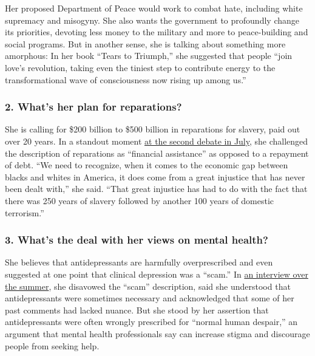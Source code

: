 Her proposed Department of Peace would work to combat hate, including
white supremacy and misogyny. She also wants the government to
profoundly change its priorities, devoting less money to the military
and more to peace-building and social programs. But in another sense,
she is talking about something more amorphous: In her book ``Tears to
Triumph,'' she suggested that people ``join love's revolution, taking
even the tiniest step to contribute energy to the transformational wave
of consciousness now rising up among us.''

\hypertarget{2-whats-her-plan-for-reparations}{%
\subsubsection{\texorpdfstring{\textbf{2. What's her plan for
reparations?}}{2. What's her plan for reparations?}}\label{2-whats-her-plan-for-reparations}}

She is calling for \$200 billion to \$500 billion in reparations for
slavery, paid out over 20 years. In a standout moment
\href{https://www.nytimes.com/2019/07/30/us/politics/marianne-williamson-debate-quotes.html}{at
the second debate in July}, she challenged the description of
reparations as ``financial assistance'' as opposed to a repayment of
debt. ``We need to recognize, when it comes to the economic gap between
blacks and whites in America, it does come from a great injustice that
has never been dealt with,'' she said. ``That great injustice has had to
do with the fact that there was 250 years of slavery followed by another
100 years of domestic terrorism.''

\hypertarget{3-whats-the-deal-with-her-views-on-mental-health}{%
\subsubsection{\texorpdfstring{\textbf{3. What's the deal with her views
on mental
health?}}{3. What's the deal with her views on mental health?}}\label{3-whats-the-deal-with-her-views-on-mental-health}}

She believes that antidepressants are harmfully overprescribed and even
suggested at one point that clinical depression was a ``scam.'' In
\href{https://www.nytimes.com/2019/07/27/us/politics/marianne-williamson-mental-health.html}{an
interview over the summer}, she disavowed the ``scam'' description, said
she understood that antidepressants were sometimes necessary and
acknowledged that some of her past comments had lacked nuance. But she
stood by her assertion that antidepressants were often wrongly
prescribed for ``normal human despair,'' an argument that mental health
professionals say can increase stigma and discourage people from seeking
help.

